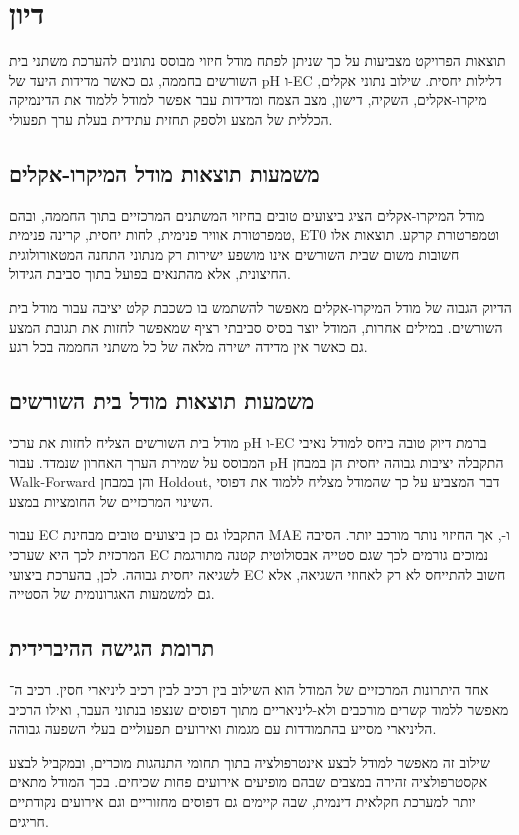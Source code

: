 \section{דיון}
תוצאות הפרויקט מצביעות על כך שניתן לפתח מודל חיזוי מבוסס נתונים להערכת משתני בית השורשים בחממה, גם כאשר מדידות היעד של pH ו-EC דלילות יחסית. שילוב נתוני אקלים, מיקרו-אקלים, השקיה, דישון, מצב הצמח ומדידות עבר אפשר למודל ללמוד את הדינמיקה הכללית של המצע ולספק תחזית עתידית בעלת ערך תפעולי.

\subsection{משמעות תוצאות מודל המיקרו-אקלים}
מודל המיקרו-אקלים הציג ביצועים טובים בחיזוי המשתנים המרכזיים בתוך החממה, ובהם טמפרטורת אוויר פנימית, לחות יחסית, קרינה פנימית, ET0 וטמפרטורת קרקע. תוצאות אלו חשובות משום שבית השורשים אינו מושפע ישירות רק מנתוני התחנה המטאורולוגית החיצונית, אלא מהתנאים בפועל בתוך סביבת הגידול.

הדיוק הגבוה של מודל המיקרו-אקלים מאפשר להשתמש בו כשכבת קלט יציבה עבור מודל בית השורשים. במילים אחרות, המודל יוצר בסיס סביבתי רציף שמאפשר לחזות את תגובת המצע גם כאשר אין מדידה ישירה מלאה של כל משתני החממה בכל רגע.

\subsection{משמעות תוצאות מודל בית השורשים}
מודל בית השורשים הצליח לחזות את ערכי pH ו-EC ברמת דיוק טובה ביחס למודל נאיבי המבוסס על שמירת הערך האחרון שנמדד. עבור pH התקבלה יציבות גבוהה יחסית הן במבחן Walk-Forward והן במבחן Holdout, דבר המצביע על כך שהמודל מצליח ללמוד את דפוסי השינוי המרכזיים של החומציות במצע.

עבור EC התקבלו גם כן ביצועים טובים מבחינת MAE ו-\Rtwo{}, אך החיזוי נותר מורכב יותר. הסיבה המרכזית לכך היא שערכי EC נמוכים גורמים לכך שגם סטייה אבסולוטית קטנה מתורגמת לשגיאה יחסית גבוהה. לכן, בהערכת ביצועי EC חשוב להתייחס לא רק לאחוזי השגיאה, אלא גם למשמעות האגרונומית של הסטייה.

\subsection{תרומת הגישה ההיברידית}
אחד היתרונות המרכזיים של המודל הוא השילוב בין רכיב \GB{} לבין רכיב ליניארי חסין. רכיב ה־\GB{} מאפשר ללמוד קשרים מורכבים ולא-ליניאריים מתוך דפוסים שנצפו בנתוני העבר, ואילו הרכיב הליניארי מסייע בהתמודדות עם מגמות ואירועים תפעוליים בעלי השפעה גבוהה.

שילוב זה מאפשר למודל לבצע אינטרפולציה בתוך תחומי התנהגות מוכרים, ובמקביל לבצע אקסטרפולציה זהירה במצבים שבהם מופיעים אירועים פחות שכיחים. בכך המודל מתאים יותר למערכת חקלאית דינמית, שבה קיימים גם דפוסים מחזוריים וגם אירועים נקודתיים חריגים.

